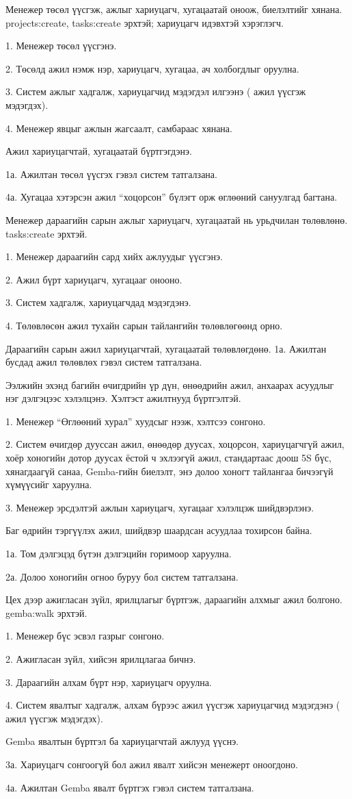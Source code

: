 {Менежер төсөл үүсгэж, ажлыг хариуцагч, хугацаатай оноож, биелэлтийг хянана.}
{projects:create, tasks:create эрхтэй; хариуцагч идэвхтэй хэрэглэгч.}
{1. Менежер төсөл үүсгэнэ.\par
 2. Төсөлд ажил нэмж нэр, хариуцагч, хугацаа, ач холбогдлыг оруулна.\par
 3. Систем ажлыг хадгалж, хариуцагчид мэдэгдэл илгээнэ ( ажил үүсгэж мэдэгдэх).\par
 4. Менежер явцыг ажлын жагсаалт, самбараас хянана.}
{Ажил хариуцагчтай, хугацаатай бүртгэгдэнэ.}
{1а. Ажилтан төсөл үүсгэх гэвэл систем татгалзана.\par
 4а. Хугацаа хэтэрсэн ажил ``хоцорсон'' бүлэгт орж өглөөний сануулгад багтана.}

{Менежер дараагийн сарын ажлыг хариуцагч, хугацаатай нь урьдчилан төлөвлөнө.}
{tasks:create эрхтэй.}
{1. Менежер дараагийн сард хийх ажлуудыг үүсгэнэ.\par
 2. Ажил бүрт хариуцагч, хугацааг онооно.\par
 3. Систем хадгалж, хариуцагчдад мэдэгдэнэ.\par
 4. Төлөвлөсөн ажил тухайн сарын тайлангийн төлөвлөгөөнд орно.}
{Дараагийн сарын ажил хариуцагчтай, хугацаатай төлөвлөгдөнө.}
{1а. Ажилтан бусдад ажил төлөвлөх гэвэл систем татгалзана.}

{Ээлжийн эхэнд багийн өчигдрийн үр дүн, өнөөдрийн ажил, анхаарах асуудлыг нэг дэлгэцээс хэлэлцэнэ.}
{Хэлтэст ажилтнууд бүртгэлтэй.}
{1. Менежер ``Өглөөний хурал'' хуудсыг нээж, хэлтсээ сонгоно.\par
 2. Систем өчигдөр дууссан ажил, өнөөдөр дуусах, хоцорсон, хариуцагчгүй ажил, хоёр хоногийн дотор дуусах ёстой ч эхлээгүй ажил, стандартаас доош 5S бүс, хянагдаагүй санаа, Gemba-гийн биелэлт, энэ долоо хоногт тайлангаа бичээгүй хүмүүсийг харуулна.\par
 3. Менежер эрсдэлтэй ажлын хариуцагч, хугацааг хэлэлцэж шийдвэрлэнэ.}
{Баг өдрийн тэргүүлэх ажил, шийдвэр шаардсан асуудлаа тохирсон байна.}
{1а. Том дэлгэцэд бүтэн дэлгэцийн горимоор харуулна.\par
 2а. Долоо хоногийн огноо буруу бол систем татгалзана.}

{Цех дээр ажигласан зүйл, ярилцлагыг бүртгэж, дараагийн алхмыг ажил болгоно.}
{gemba:walk эрхтэй.}
{1. Менежер бүс эсвэл газрыг сонгоно.\par
 2. Ажигласан зүйл, хийсэн ярилцлагаа бичнэ.\par
 3. Дараагийн алхам бүрт нэр, хариуцагч оруулна.\par
 4. Систем явалтыг хадгалж, алхам бүрээс ажил үүсгэж хариуцагчид мэдэгдэнэ ( ажил үүсгэж мэдэгдэх).}
{Gemba явалтын бүртгэл ба хариуцагчтай ажлууд үүснэ.}
{3а. Хариуцагч сонгоогүй бол ажил явалт хийсэн менежерт оноогдоно.\par
 4а. Ажилтан Gemba явалт бүртгэх гэвэл систем татгалзана.}

